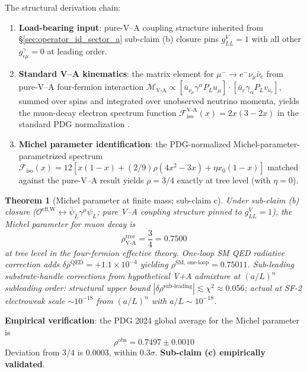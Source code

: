 \documentclass[11pt,letterpaper]{article}
\newtheorem{theorem}{Theorem}[section]
\newcommand{\OeffW}{\mathcal{O}^{\text{eff,W}}}
\begin{document}
The structural derivation chain:

\begin{enumerate}[leftmargin=*]
\item \textbf{Load-bearing input}: pure-V--A coupling structure inherited from §\ref{sec:operator_id_sector_a} sub-claim (b) closure pins $g^V_{LL} = 1$ with all other $g^\gamma_{\epsilon\mu} = 0$ at leading order.
\item \textbf{Standard V--A kinematics}: the matrix element for $\mu^- \to e^- \nu_\mu \bar{\nu}_e$ from pure-V--A four-fermion interaction $\mathcal{M}_{\text{V-A}} \propto [\bar{u}_{\nu_\mu} \gamma^\alpha P_L u_\mu] \cdot [\bar{u}_e \gamma_\alpha P_L v_{\bar{\nu}_e}]$, summed over spins and integrated over unobserved neutrino momenta, yields the muon-decay electron spectrum function $\mathcal{F}_{\text{iso}}^{\text{V-A}}(x) = 2x(3 - 2x)$ in the standard PDG normalization \cite{PDG2024, ChengLi}.
\item \textbf{Michel parameter identification}: the PDG-normalized Michel-parameter-parametrized spectrum $\mathcal{F}_{\text{iso}}(x) = 12[x(1-x) + (2/9)\rho(4x^2 - 3x) + \eta x_0 (1-x)]$ matched against the pure-V--A result yields $\rho = 3/4$ exactly at tree level (with $\eta = 0$).
\end{enumerate}

\begin{theorem}[Michel parameter at finite mass; sub-claim c]
\label{thm:michel}
Under sub-claim (b) closure ($\OeffW \leftrightarrow \bar{\psi}_L \gamma^\mu \psi_L$; pure V--A coupling structure pinned to $g^V_{LL} = 1$), the Michel parameter for muon decay is
\begin{equation}
\rho_{\text{V-A}}^{\text{tree}} = \frac{3}{4} = 0.7500
\label{eq:michel_prediction}
\end{equation}
at tree level in the four-fermion effective theory. One-loop SM QED radiative correction adds $\delta\rho^{\text{QED}} = +1.1 \times 10^{-4}$ \cite{MarcianoSirlin1988} yielding $\rho^{\text{SM, one-loop}} = 0.75011$. Sub-leading substrate-handle corrections from hypothetical V+A admixture at $(a/L)^n$ subleading order: structural upper bound $|\delta\rho^{\text{sub-leading}}| \lesssim \chi^2 \approx 0.056$; actual at SF-2 electroweak scale $\sim 10^{-18}$ from $(a/L)^n$ with $a/L \sim 10^{-18}$.
\end{theorem}

\textbf{Empirical verification}: the PDG 2024 global average for the Michel parameter \cite{PDG2024, TWISTrho} is
\begin{equation}
\rho^{\text{obs}} = 0.7497 \pm 0.0010
\label{eq:michel_observed}
\end{equation}
Deviation from $3/4$ is $0.0003$, within $0.3\sigma$. \textbf{Sub-claim (c) empirically validated}.
\end{document}
